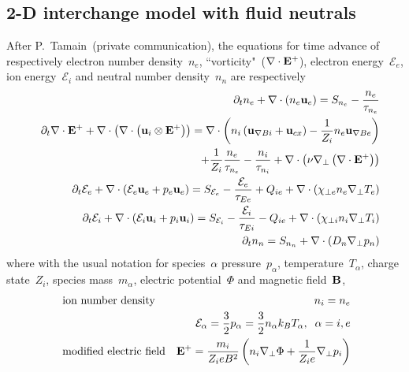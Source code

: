 \subsection{2-D interchange model with fluid neutrals}\label{sec:2D_interchange}

After P.~Tamain~(private communication), the equations for time advance
of respectively electron number density~$n_e$, ``vorticity"~($\nabla \cdot {\bf E}^{+}$),
electron energy~$\mathcal{E}_e$, ion energy~$\mathcal{E}_i$ and 
neutral number density~$n_n$ are respectively
\begin{eqnarray}
& & \partial_t n_e + \nabla \cdot \left( n_e {\bf u}_e \right) = 
S_{n_e} - \frac{n_e}{\tau_{n_e}} \\
& & \partial_t \nabla \cdot {\bf E}^{+} + \nabla \cdot 
\left( \nabla \cdot \left( {\bf u}_i \otimes {\bf E}^{+} \right) 
\right) = \nabla \cdot \left( n_i \left( {\bf u}_{\nabla B i} + 
{\bf u}_{cx} \right) - \frac{1}{{Z_i}} n_e {\bf u}_{\nabla B 
e} \right) \nonumber \\
& & \hspace{5cm} + \frac{1}{{Z_i}} \frac{n_e}{\tau_{n_e}} - 
\frac{n_i}{\tau_{n_i}} + \nabla \cdot \left( {\nu} 
\nabla_\perp \left( \nabla \cdot {\bf E}^{+} \right) 
\right) \\
& & \partial_t \mathcal{E}_e + \nabla \cdot \left( \mathcal{E}_e {\bf u}_e + p_e 
{\bf u}_e \right) = S_{\mathcal{E}_e} - \frac{\mathcal{E}_e}{\tau_{Ee}} + Q_{ie} + 
\nabla \cdot \left( {\chi_{\perp e}} n_e 
\nabla_\perp T_e \right) \\
& & \partial_t \mathcal{E}_i + \nabla \cdot \left( \mathcal{E}_i {\bf u}_i + p_i 
{\bf u}_i \right) = S_{\mathcal{E}_i} - \frac{\mathcal{E}_i}{\tau_{Ei}} - Q_{ie} + 
\nabla \cdot \left( {\chi_{\perp i}} n_i 
\nabla_\perp T_i \right) \\
& & \partial_t n_n = S_{n_n} + \nabla \cdot \left( D_n  
\nabla_\perp p_n \right)
\end{eqnarray}
where with the usual notation for species~$\alpha$ pressure~$p_\alpha$,
temperature~$T_\alpha$, charge state~$Z_i$,
species mass~$m_\alpha$, electric potential~$\Phi$ and magnetic field~${\bf B}$, 
\begin{eqnarray}
& \mbox{ ion number density} & n_i = n_e \\
& & \mathcal{E}_{\alpha} = \frac{3}{2} p_{\alpha}  = \frac{3}{2} n_{\alpha} k_B T_{\alpha},\;\; \alpha=i,e \\
& \mbox{ modified electric field} & {\bf E}^{+} = \frac{m_i}{Z_i e B^2} \left( n_i \nabla_\perp 
\Phi + \frac{1}{Z_i e} \nabla_\perp p_i \right) \\
\end{eqnarray}


